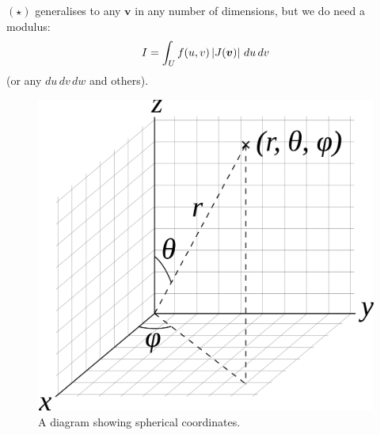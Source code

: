 \begin{remark}
    $(\star)$ generalises to any $\bm v$ in any number of dimensions, but
    we do need a modulus:
    \[
        I = \int_U f(u,v) \left\lvert J(\bm v)\right\rvert \,du\,dv
    \]
    (or any $du\,dv\,dw$ and others).
\end{remark}

\begin{figure}[]
    \centering
    \includegraphics[width=0.8\linewidth]{images/spherical-coordinates.png}
    \caption{A diagram showing spherical coordinates.}%
    \label{fig:spherical-coordinates}
\end{figure}

